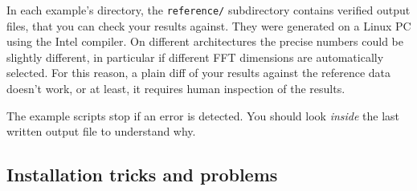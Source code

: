 \documentclass[12pt,a4paper]{article}
\begin{document}
In each example's directory, the \texttt{reference/} subdirectory contains
verified output files, that you can check your results against. They
were generated on a Linux PC using the Intel compiler. On different
architectures the precise numbers could be slightly different, in
particular if different FFT dimensions are automatically selected. For
this reason, a plain diff of your results against the reference data
doesn't work, or at least, it requires human inspection of the results.

The example scripts stop if an error is detected. You should look {\em inside}
the last written output file to understand why.

\subsection{Installation tricks and problems}
\end{document}
